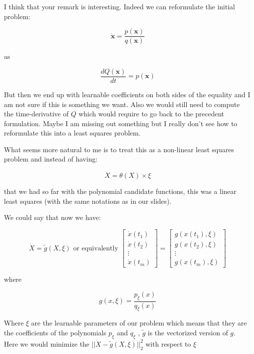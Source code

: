 \documentclass[12pt, a4]{article}
\begin{document}
I think that your remark is interesting. Indeed we can reformulate the initial problem:

$$\dot{\mathbf{x}} = \frac{p(\mathbf{x})}{q(\mathbf{x})}$$

as 

$$\frac{d Q(\mathbf{x})}{dt} = p(\mathbf{x})$$

But then we end up with learnable coefficients on both sides of the equality and I am not sure if this is something we want. Also we would still need to compute the time-derivative of $Q$ which would require to go back to the precedent formulation. Maybe I  am missing out something but I really don't see how to reformulate this into a least squares problem.


What seems more natural to me is to treat this as a non-linear least squares problem and instead of having:

$$\dot{X} = \theta(X) \times \xi $$

that we had so far with the polynomial candidate functions, this was a linear least squares (with the same notations as in our slides).

We could say that now we have:

$$\dot{X} = \tilde{g}(X, \xi) \text{ or equivalently }
\begin{bmatrix}
\dot{x}(t_1) \\
\dot{x}(t_2) \\
\vdots \\
\dot{x}(t_m)
\end{bmatrix}
 = 
\begin{bmatrix}
g(x(t_1) , \xi)\\
g(x(t_2) , \xi) \\
\vdots \\
g(x(t_m) , \xi)
\end{bmatrix}
$$


where

$$g(x, \xi) = \frac{p_\xi(x)}{q_\xi(x)}$$

Where $\xi$ are the learnable parameters of our problem which means that they are the coefficients of the polynomials $p_\xi$ and $q_\xi$ , $\tilde{g}$ is the vectorized version of $g$.  Here we would minimize the $||\dot{X} - \tilde{g}(X, \xi)||_2^2$ with respect to $\xi$
\end{document}
